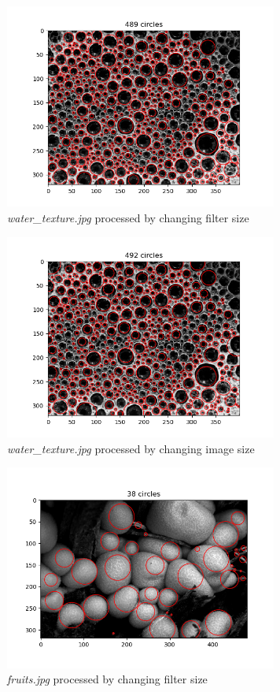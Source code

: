 \documentclass{article}
\begin{document}
\begin{figure}[H]
\centering
\includegraphics[width=0.8\textwidth]{figs/water_filter.png}
\caption{\textit{water\_texture.jpg} processed by changing filter size}
\end{figure}



\begin{figure}[H]
\centering
\includegraphics[width=0.8\textwidth]{figs/water_image.png}
\caption{\textit{water\_texture.jpg} processed by changing image size}
\end{figure}



\begin{figure}[H]
\centering
\includegraphics[width=0.8\textwidth]{figs/fruits_filter.png}
\caption{\textit{fruits.jpg} processed by changing filter size}
\end{figure}
\end{document}
